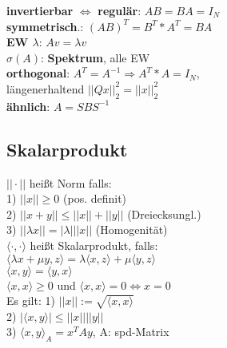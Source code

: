 \textbf{invertierbar} $\Leftrightarrow$ \textbf{regulär}: $AB = BA = I_{N}$\\
\textbf{symmetrisch}.: $(AB)^{T} = B^{T}*A^{T} = BA$\\
\textbf{EW $\lambda$}: $Av = \lambda v$\\ 
$\sigma(A)$: \textbf{Spektrum}, alle EW\\
\textbf{orthogonal}: $A^T = A^{-1} \Rightarrow A^T * A = I_N$,\\
längenerhaltend $||Qx||_2^2 = ||x||_2^2$\\
\textbf{ähnlich}: $A = SBS^{-1}$
\subsection*{Skalarprodukt}
$||\cdot||$ heißt Norm falls: \\
1) $||x|| \geq 0$ (pos. definit)\\
2) $||x + y|| \leq ||x|| + ||y||$ (Dreiecksungl.)\\
3) $||\lambda x|| = |\lambda| ||x||$ (Homogenität)\\
$\langle \cdot , \cdot \rangle$ heißt Skalarprodukt, falls:\\
$\langle \lambda x + \mu y , z \rangle = \lambda\langle x , z \rangle + \mu\langle y , z \rangle$\\
$\langle x , y \rangle = \langle y , x \rangle$\\
$\langle x , x \rangle \geq 0 $ und $\langle x , x \rangle = 0 \Leftrightarrow x = 0$\\
Es gilt: 1) $||x|| := \sqrt{\langle x , x \rangle}$\\
2) $|\langle x , y \rangle| \leq ||x|| ||y||$\\
3) $\langle x , y \rangle_{A} = x^{T}Ay$, A: spd-Matrix
